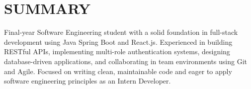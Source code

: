 \section{SUMMARY}
\noindent Final-year Software Engineering student with a solid foundation in full-stack development using Java Spring Boot and React.js. Experienced in building RESTful APIs, implementing multi-role authentication systems, designing database-driven applications, and collaborating in team environments using Git and Agile. Focused on writing clean, maintainable code and eager to apply software engineering principles as an Intern Developer.
